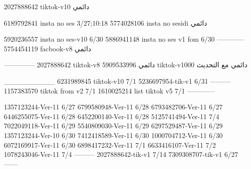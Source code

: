 2027888642 tiktok-v10
دائمي

6189792841 insta no ses
3/27;10:18
5774028106 insta no sesidi
دائمي


5920236557 insta no ses-v10
6/30
5886941148 insta no ses v1 fom
6/30
------------
5754454119 facbook-v8
دائمي


--------------
2027888642 tiktok-v8
دائمي
5909533996 tiktok-v1000
دائمي مع التحديث

__________
6231989845 tiktok-v10
7/1
5236697954-tik-v1
6/31
---------
1157383570 tiktok from v2
7/1
1610025214 list tiktok v5
7/1
------------

1357123244-Ver-11
6/27
6799580948-Ver-11
6/28
6793482706-Ver-11
6/27
6446255075-Ver-11
6/28
6452200140-Ver-11
6/28
5125741494-Ver-11
7/4
7022049118-Ver-11
6/29
5540809030-Ver-11
6/29
6297529487-Ver-11
6/29
1357123244-Ver-10
6/30
7412418589-Ver-11
6/30
1000704712-Ver-11
6/30
6072169917-Ver-11
6/30
6898417232-Ver-11
7/1
6633416107-Ver-11
7/2
1078243046-Ver-11
7/4
---------
2027888642-tik-v1
7/14
7309308707-tik-v1
6/27
------

